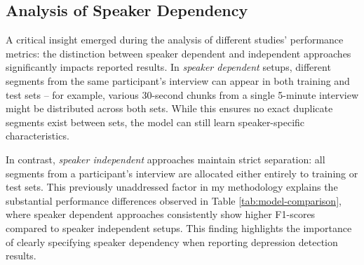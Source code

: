 \begin{table}[t]
    \centering
    \caption{Comparison of Depression Detection Models}
    \label{tab:model-comparison}
\end{table}

\subsection{Analysis of Speaker Dependency}
A critical insight emerged during the analysis of different studies' performance metrics: the distinction between speaker dependent and independent approaches significantly impacts reported results. In \textit{speaker dependent} setups, different segments from the same participant's interview can appear in both training and test sets -- for example, various 30-second chunks from a single 5-minute interview might be distributed across both sets. While this ensures no exact duplicate segments exist between sets, the model can still learn speaker-specific characteristics.

In contrast, \textit{speaker independent} approaches maintain strict separation: all segments from a participant's interview are allocated either entirely to training or test sets. This previously unaddressed factor in my methodology explains the substantial performance differences observed in Table \ref{tab:model-comparison}, where speaker dependent approaches consistently show higher F1-scores compared to speaker independent setups. This finding highlights the importance of clearly specifying speaker dependency when reporting depression detection results.

